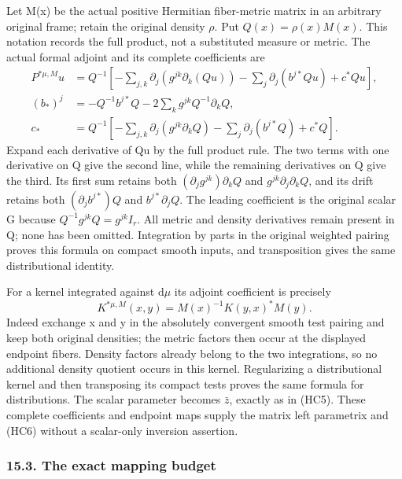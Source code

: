 \documentclass[
  11pt,
]{article}
\begin{document}
Let M(x) be the actual positive Hermitian fiber-metric matrix in an
arbitrary original frame; retain the original density \ensuremath{\rho}. Put
\(Q(x)=\rho(x)M(x)\). This notation records the full product, not a
substituted measure or metric. The actual formal adjoint and its
complete coefficients are \[
\begin{split}
P^{*\mu,M}u
&=Q^{-1}\left[-\sum_{j,k}\partial_j(g^{jk}\partial_k(Qu))
              -\sum_j\partial_j(b^{j*}Qu)+c^*Qu\right],\\
(b_*)^j
&=-Q^{-1}b^{j*}Q-2\sum_kg^{jk}Q^{-1}\partial_kQ,\\
c_*
&=Q^{-1}\left[-\sum_{j,k}\partial_j(g^{jk}\partial_kQ)
               -\sum_j\partial_j(b^{j*}Q)+c^*Q\right].
\end{split}
\tag{HD4}
\] Expand each derivative of Qu by the full product rule. The two terms
with one derivative on Q give the second line, while the remaining
derivatives on Q give the third. Its first sum retains both
\((\partial_jg^{jk})\partial_kQ\) and \(g^{jk}\partial_j\partial_kQ\),
and its drift retains both \((\partial_jb^{j*})Q\) and
\(b^{j*}\partial_jQ\). The leading coefficient is the original scalar G
because \(Q^{-1}g^{jk}Q=g^{jk}I_r\). All metric and density derivatives
remain present in Q; none has been omitted. Integration by parts in the
original weighted pairing proves this formula on compact smooth inputs,
and transposition gives the same distributional identity.

For a kernel integrated against d\ensuremath{\mu} its adjoint coefficient is precisely
\[
K^{*\mu,M}(x,y)=M(x)^{-1}K(y,x)^*M(y).
\tag{HD5}
\] Indeed exchange x and y in the absolutely convergent smooth test
pairing and keep both original densities; the metric factors then occur
at the displayed endpoint fibers. Density factors already belong to the
two integrations, so no additional density quotient occurs in this
kernel. Regularizing a distributional kernel and then transposing its
compact tests proves the same formula for distributions. The scalar
parameter becomes \(\bar z\), exactly as in (HC5). These complete
coefficients and endpoint maps supply the matrix left parametrix and
(HC6) without a scalar-only inversion assertion.

\subsubsection{15.3. The exact mapping
budget}\label{the-exact-mapping-budget}
\end{document}
